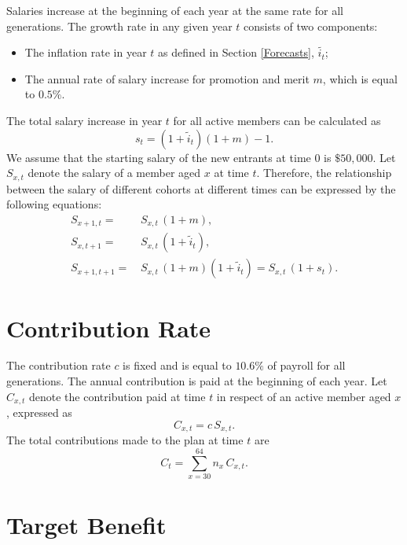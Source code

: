 \documentclass{sfuthesis}
\numberwithin{equation}{chapter}
\begin{document}
		\justify
		Salaries increase at the beginning of each year at the same rate for all generations. The growth rate in any given year $t$ consists of two components:
		\begin{itemize}
			\item The inflation rate in year $t$ as defined in Section \ref{Forecasts}, $\tilde{i_t}$;
			\item The annual rate of salary increase for promotion and merit $m$, which is equal to $0.5\%$.
		\end{itemize}
		The total salary increase in year $t$ for all active members can be calculated as
		\begin{equation}
		\label{eq:STBP_2}
		s_{t} = (1+\tilde{i}_t)(1+m)-1.
		\end{equation}
		We assume that the starting salary of the new entrants at time 0 is $\$50,000$. Let $S_{x,t}$ denote the salary of a member aged $x$ at time $t$. Therefore, the relationship between the salary of different cohorts at different times can be expressed by the following equations:
		\begin{align}
		S_{x+1,t} = &\, S_{x,t}\,(1+m), \label{eq:STBP_3}\\
		S_{x,t+1} = &\, S_{x,t}\,(1+\tilde{i}_t), \label{eq:STBP_4}\\
		S_{x+1,t+1}=&\, S_{x,t}\,(1+m)(1+\tilde{i}_t) = S_{x,t}\,(1+s_{t}). \label{eq:STBP_5}
		\end{align}

	
	\section{Contribution Rate}
	\label{Contribution Rate}
	
		\justify
		The contribution rate $c$ is fixed and is equal to $10.6\%$ of payroll for all generations. The annual contribution is paid at the beginning of each year. Let $C_{x,t}$ denote the contribution paid at time $t$ in respect of an active member aged $x$, expressed as
		\begin{equation}
		\label{eq:STBP_6}
		C_{x,t} = c \, S_{x,t}.
		\end{equation}
		The total contributions made to the plan at time $t$ are
		\begin{equation}
		\label{eq:STBP_7}
		C_{t} = \sum_{x=30}^{64} n_x \, C_{x,t}.
		\end{equation}
	
	
	\section{Target Benefit}
	\label{Target Benefit}
	
\end{document}

